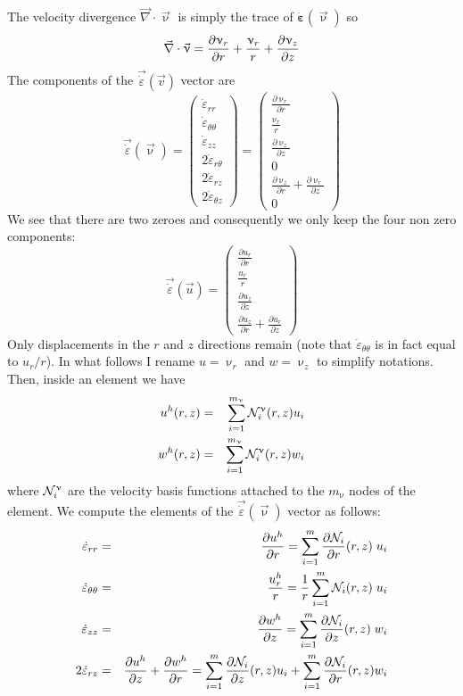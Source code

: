 The velocity divergence $\vec\nabla \cdot \vec{\upnu}$ is simply the trace of $\dot{\bm \varepsilon}(\vec{\upnu})$ so 
\[
\vec\nabla \cdot \vec{\upnu}
= {\partial \upnu_r \over \partial r} +{\upnu_r \over r}
+{\partial \upnu_{z} \over \partial z}
\]
The components of the $\vec{\dot{\varepsilon}}(\vec{v})$ vector are
\[
\vec{\dot{\varepsilon}}(\vec \upnu)
=
\left(
\begin{array}{c}
\dot\varepsilon_{rr} \\
\dot\varepsilon_{\theta\theta} \\
\dot\varepsilon_{zz} \\
2\dot\varepsilon_{r\theta} \\
2\dot\varepsilon_{rz} \\
2\dot\varepsilon_{\theta z} 
\end{array}
\right)
=
\left(
\begin{array}{c}
\frac{\partial \upnu_r}{\partial r} \\ 
\frac{\upnu_r}{r} \\ 
\frac{\partial \upnu_z}{\partial z} \\ 
0 \\ 
\frac{\partial \upnu_z}{\partial r}+\frac{\partial \upnu_r}{\partial z} \\ 
0
\end{array}
\right)
\]
We see that there are two zeroes and consequently
we only keep the four non zero components:
\[
\vec{\dot{\varepsilon}}(\vec u)
=
\left(
\begin{array}{c}
\frac{\partial u_r}{\partial r} \\ 
\frac{u_r}{r} \\ 
\frac{\partial u_z}{\partial z} \\ 
\frac{\partial u_z}{\partial r}+\frac{\partial u_r}{\partial z} 
\end{array}
\right)
\]
Only displacements in the $r$ and $z$ directions remain (note that $\dot\varepsilon_{\theta\theta}$ is in fact equal to $u_r/r$). In what follows I rename $u=\upnu_r$ and $w=\upnu_z$ to simplify notations. 
Then, inside an element we have 
\begin{eqnarray}
u^h(r,z) &=& \sum_{i=1}^{m_\upnu} {\mathcal{N}}_i^\upnu(r,z) u_i \nonumber\\
w^h(r,z) &=& \sum_{i=1}^{m_\upnu} {\mathcal{N}}_i^\upnu(r,z) w_i
\end{eqnarray}
where ${\mathcal{N}}_i^\upnu$ are the velocity basis functions attached 
to the $m_\upnu$ nodes of the element.
We compute the elements of the $\vec{\dot{\varepsilon}}(\vec\upnu)$ vector as follows:
\begin{eqnarray}
\dot\varepsilon_{rr} &=&
\frac{\partial u^h}{\partial r} 
= \sum_{i=1}^m \frac{\partial {\mathcal{N}}_i}{\partial r}(r,z) \; u_i \\
\dot\varepsilon_{\theta\theta} &=& \frac{u_r^h}{r} = 
\frac{1}{r}\sum_{i=1}^m {\mathcal{N}}_i(r,z) \;  u_i \\
\dot\varepsilon_{zz} &=& 
\frac{\partial w^h}{\partial z}
= \sum_{i=1}^m \frac{\partial {\mathcal{N}}_i}{\partial z}(r,z) \; w_i \\
2\dot\varepsilon_{rz} &=& \frac{\partial u^h}{\partial z}
+ \frac{\partial w^h}{\partial r}
= \sum_{i=1}^m \frac{\partial {\mathcal{N}}_i}{\partial z}(r,z) u_i 
+ \sum_{i=1}^m \frac{\partial {\mathcal{N}}_i}{\partial r}(r,z) w_i 
\end{eqnarray}
